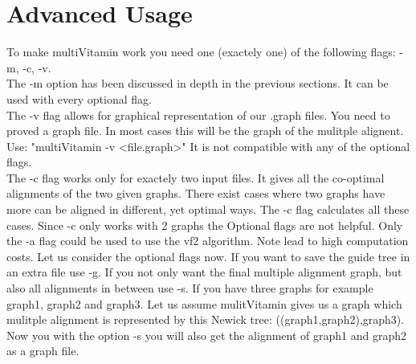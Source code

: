 \documentclass{SeminarV2}
\begin{document}
\section{Advanced Usage}
To make multiVitamin work you need one (exactely one) of the following flags:
-m, -c, -v.\\
The -m option has been discussed in depth in the previous sections. It can be used with
every optional flag.\\
The -v flag allows for graphical representation of our .graph files.
You need to proved a graph file. In most cases this will be the graph of the mulitple
alignent. Use: "multiVitamin -v <file.graph>"
It is not compatible with any of the optional flags.\\
The -c flag works only for exactely two input files.
It gives all the co-optimal alignments of the two given graphs. There exist
cases where two graphs have more can be aligned in different, yet optimal ways.
The -c flag calculates all these cases.
Since -c only works with 2 graphs the Optional flags are not helpful.
Only the -a flag could be used to use the vf2 algorithm. Note lead to high
computation costs.
Let us consider the optional flags now.
If you want to save the guide tree in an extra file use -g.
If you not only want the final multiple alignment graph, but also
all alignments in between use -s. If you have three graphs for example graph1, graph2
and graph3. Let us assume mulitVitamin gives us a graph which mulitple alignment
is represented by this Newick tree: ((graph1,graph2),graph3). Now you
with the option -s you will also get the alignment of graph1 and graph2 as a graph file.\\
\end{document}
